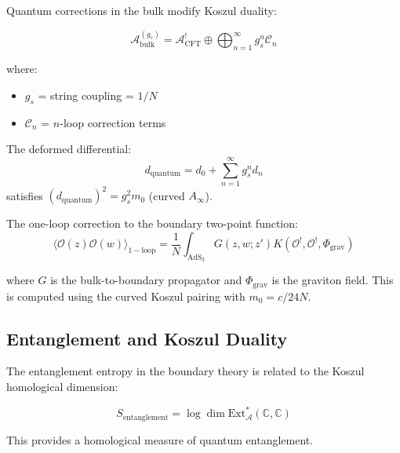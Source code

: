 \begin{theorem}
Quantum corrections in the bulk modify Koszul duality:

$$\mathcal{A}_{\text{bulk}}^{(g_s)} = \mathcal{A}_{\text{CFT}}^! \oplus \bigoplus_{n=1}^\infty g_s^n \mathcal{C}_n$$

where:
\begin{itemize}
\item $g_s$ = string coupling = $1/N$
\item $\mathcal{C}_n$ = $n$-loop correction terms
\end{itemize}

The deformed differential:
$$d_{\text{quantum}} = d_0 + \sum_{n=1}^\infty g_s^n d_n$$
satisfies $(d_{\text{quantum}})^2 = g_s^2 m_0$ (curved $A_\infty$).
\end{theorem}

\begin{example}
The one-loop correction to the boundary two-point function:
$$\langle \mathcal{O}(z) \mathcal{O}(w) \rangle_{1-\text{loop}} = \frac{1}{N} \int_{\text{AdS}_3} G(z,w;z') K(\mathcal{O}^!, \mathcal{O}^!, \Phi_{\text{grav}})$$

where $G$ is the bulk-to-boundary propagator and $\Phi_{\text{grav}}$ is the graviton field.
This is computed using the curved Koszul pairing with $m_0 = c/24N$.
\end{example}

\subsection{Entanglement and Koszul Duality}

\begin{conjecture}[Entanglement = Koszul Complexity]
The entanglement entropy in the boundary theory is related to the Koszul homological dimension:

$$S_{\text{entanglement}} = \log \dim \text{Ext}^*_{\mathcal{A}}(\mathbb{C}, \mathbb{C})$$

This provides a homological measure of quantum entanglement.
\end{conjecture}

